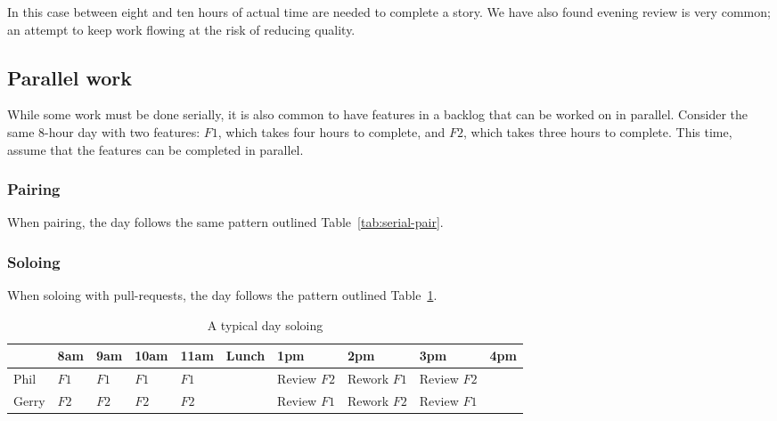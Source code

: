 \documentclass[letterpaper]{article}
\theoremstyle{definition}
\begin{document}
    In this case between eight and ten hours of actual time are needed to complete a story.
    We have also found evening review is very common;
    an attempt to keep work flowing at the risk of reducing quality.

    \subsection{Parallel work}\label{subsec:parallel-work}

    While some work must be done serially, it is also common to have features in a backlog that can be worked on in
    parallel.
    Consider the same 8-hour day with two features: $F1$, which takes four hours to complete, and
    $F2$, which takes three hours to complete.
    This time, assume that the features can be completed in parallel.

    \subsubsection{Pairing}\label{subsubsec:parallel-pairing}

    When pairing, the day follows the same pattern outlined Table~\ref{tab:serial-pair}.

    \subsubsection{Soloing}\label{subsubsec:parallel-soloing}

    When soloing with pull-requests, the day follows the pattern outlined Table~\ref{tab:parallel-solo}.

    \begin{table}[h]
        \centering
        \tiny
        \begin{tabular}{ |l|l|l|l|l|l|l|l|l|l| }
            \hline
            & 8am                     & 9am                     & 10am                    & 11am                    & Lunch & 1pm                            & 2pm                            & 3pm                            & 4pm \\
            \hline
            Phil  & \cellcolor{blue!10}$F1$ & \cellcolor{blue!10}$F1$ & \cellcolor{blue!10}$F1$ & \cellcolor{blue!10}$F1$ &       & \cellcolor{red!10}Review $F2$ & \cellcolor{blue!10}Rework $F1$ & \cellcolor{red!10}Review $F2$ &     \\
            \hline
            Gerry & \cellcolor{red!10}$F2$  & \cellcolor{red!10}$F2$  & \cellcolor{red!10}$F2$  & \cellcolor{red!10}$F2$ &       & \cellcolor{blue!10}Review $F1$ & \cellcolor{red!10}Rework $F2$ & \cellcolor{blue!10}Review $F1$ &     \\
            \hline
        \end{tabular}
        \caption{A typical day soloing}
        \label{tab:parallel-solo}
    \end{table}
\end{document}
